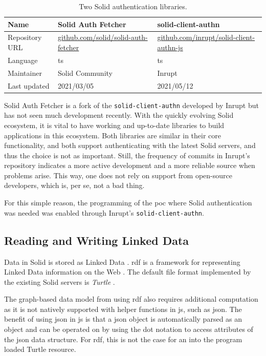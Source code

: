 \begin{table}[h!]
    \centering
    \begin{tabular}{| l | l | l |} 
     \hline
     Name & Solid Auth Fetcher & solid-client-authn \\
     \hline
     Repository URL & \url{github.com/solid/solid-auth-fetcher} & \url{github.com/inrupt/solid-client-authn-js} \\
     \hline
     Language & \gls{ts} & \gls{ts} \\
     \hline
     Maintainer & Solid Community & Inrupt \\
     \hline
     Last updated & 2021/03/05 & 2021/05/12 \\
     \hline
    \end{tabular}
    \vspace{0.75cm}
    \caption{Two Solid authentication libraries.}
    \label{table:0}
\end{table}

Solid Auth Fetcher is a fork of the \texttt{solid-client-authn} developed by Inrupt but has not seen much development recently. With the quickly evolving Solid ecosystem, it is vital to have working and up-to-date libraries to build applications in this ecosystem. Both libraries are similar in their core functionality, and both support authenticating with the latest Solid servers, and thus the choice is not as important. Still, the frequency of commits in Inrupt's repository indicates a more active development and a more reliable source when problems arise. This way, one does not rely on support from open-source developers, which is, per se, not a bad thing.

For this simple reason, the programming of the \gls{poc} where Solid authentication was needed was enabled through Inrupt's \texttt{solid-client-authn}.

\subsection{Reading and Writing Linked Data}

Data in Solid is stored as Linked Data \cite{Malhotra:15:LDP}. \gls{rdf} is a framework for representing Linked Data information on the Web \cite{Cyganiak:14:RCA}. The default file format implemented by the existing Solid servers is \textit{Turtle} \cite{Prud:hommeaux:14:RT}.

The graph-based data model from using \gls{rdf} also requires additional computation as it is not natively supported with helper functions in \gls{js}, such as \gls{json}. The benefit of using \gls{json} in \gls{js} is that a \gls{json} object is automatically parsed as an object and can be operated on by using the dot notation to access attributes of the \gls{json} data structure. For \gls{rdf}, this is not the case for an into the program loaded Turtle resource.

